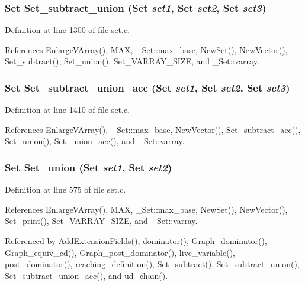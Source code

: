 \subsubsection{\setlength{\rightskip}{0pt plus 5cm}\bf{Set} Set\_\-subtract\_\-union (\bf{Set} {\em set1}, \bf{Set} {\em set2}, \bf{Set} {\em set3})}\label{set_8c_a547fe1617822e005799edfabb9deefe}




Definition at line 1300 of file set.c.

References Enlarge\-VArray(), MAX, \_\-Set::max\_\-base, New\-Set(), New\-Vector(), Set\_\-subtract(), Set\_\-union(), Set\_\-VARRAY\_\-SIZE, and \_\-Set::varray.
\subsubsection{\setlength{\rightskip}{0pt plus 5cm}\bf{Set} Set\_\-subtract\_\-union\_\-acc (\bf{Set} {\em set1}, \bf{Set} {\em set2}, \bf{Set} {\em set3})}\label{set_8c_8f0f0798fd22b37b5e96f902ee78f66d}




Definition at line 1410 of file set.c.

References Enlarge\-VArray(), \_\-Set::max\_\-base, New\-Vector(), Set\_\-subtract\_\-acc(), Set\_\-union(), Set\_\-union\_\-acc(), and \_\-Set::varray.
\subsubsection{\setlength{\rightskip}{0pt plus 5cm}\bf{Set} Set\_\-union (\bf{Set} {\em set1}, \bf{Set} {\em set2})}\label{set_8c_51dfad4c188ddf421eafb4571a1f0e12}




Definition at line 575 of file set.c.

References Enlarge\-VArray(), MAX, \_\-Set::max\_\-base, New\-Set(), New\-Vector(), Set\_\-print(), Set\_\-VARRAY\_\-SIZE, and \_\-Set::varray.

Referenced by Add\-Extension\-Fields(), dominator(), Graph\_\-dominator(), Graph\_\-equiv\_\-cd(), Graph\_\-post\_\-dominator(), live\_\-variable(), post\_\-dominator(), reaching\_\-definition(), Set\_\-subtract(), Set\_\-subtract\_\-union(), Set\_\-subtract\_\-union\_\-acc(), and ud\_\-chain().
